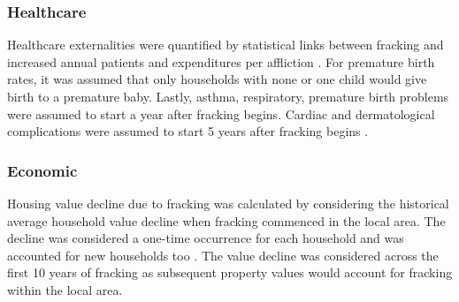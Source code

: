 \documentclass[10pt]{article}
\begin{document}
\subsubsection{Healthcare}
Healthcare externalities were quantified by statistical links between fracking and increased annual patients and expenditures per affliction \cite{015}. For premature birth rates, it was assumed that only households with none or one child would give birth to a premature baby. Lastly, asthma, respiratory, premature birth problems were assumed to start a year after fracking begins. Cardiac and dermatological complications were assumed to start 5 years after fracking begins \cite{016}.
\subsubsection{Economic}
Housing value decline due to fracking was calculated by considering the historical average household value decline when fracking commenced in the local area. The decline was considered a one-time occurrence for each household and was accounted for new households too \cite{doi:10.1080/21606544.2017.1398683}. The value decline was considered across the first 10 years of fracking as subsequent property values would account for fracking within the local area.


\end{document}
